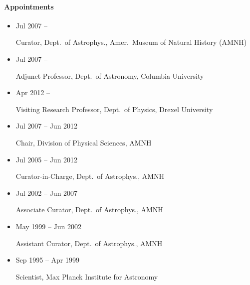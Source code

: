 \documentclass[11pt]{article}
\begin{document}
\paragraph{Appointments}
\begin{itemize}
\setlength{\itemsep}{-\parsep}
\setlength{\topsep}{-\parsep}
\setlength{\partopsep}{-\parsep}
\item \parbox{1.5in}{Jul 2007 --   } \parbox{5in}{
             Curator, Dept.\ of Astrophys., Amer.\ Museum of
             Natural History (AMNH)} 
\item \parbox{1.5in}{Jul 2007 --  } \parbox{5in}{
             Adjunct Professor, Dept.\ of Astronomy,
Columbia University} 
\item \parbox{1.5in}{Apr 2012 --   }\parbox{5in}{
             Visiting Research Professor, Dept.\ of Physics,
Drexel University} 
\item \parbox{1.5in}{Jul 2007 -- Jun 2012  }\parbox{5in}{
             Chair, Division of Physical Sciences, AMNH}  
\item \parbox{1.5in}{Jul 2005 -- Jun 2012  }\parbox{5in}{
             Curator-in-Charge, Dept.\ of Astrophys., AMNH}  
\item \parbox{1.5in}{Jul 2002 -- Jun 2007} \parbox{4.0in}{
             Associate Curator, Dept.\ of Astrophys., AMNH}  
\item \parbox{1.5in}{May 1999  -- Jun 2002}  \parbox{4.0in}{
             Assistant Curator, Dept.\ of Astrophys., AMNH} 
\item \parbox{1.5in}{Sep 1995  --  Apr 1999} \parbox{4.0in}{
             Scientist, Max Planck Institute for Astronomy} 
%
\end{itemize}
\end{document}
